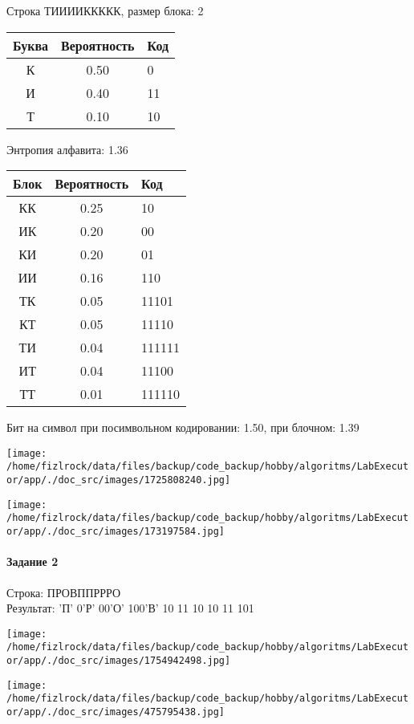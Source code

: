 \documentclass[a4paper, 12pt]{article}
\begin{document}
Строка ТИИИИККККК, размер блока: 2
\begin{center}
 \begin{tabular}{ |c|c|l| } 
  \hline
     Буква & Вероятность & Код\\ \hline
К & 0.50 & 0\\\hline
И & 0.40 & 11\\\hline
Т & 0.10 & 10
\\ \hline \end{tabular}
\end{center}
Энтропия алфавита: 1.36
\begin{center}
 \begin{tabular}{ |c|c|l| } 
  \hline
     Блок & Вероятность & Код\\ \hline
КК & 0.25 & 10\\\hline
ИК & 0.20 & 00\\\hline
КИ & 0.20 & 01\\\hline
ИИ & 0.16 & 110\\\hline
ТК & 0.05 & 11101\\\hline
КТ & 0.05 & 11110\\\hline
ТИ & 0.04 & 111111\\\hline
ИТ & 0.04 & 11100\\\hline
ТТ & 0.01 & 111110
\\ \hline \end{tabular}
\end{center}
Бит на символ при посимвольном кодировании: 1.50, при блочном: 1.39

\texttt{[image: /home/fizlrock/data/files/backup/code\_backup/hobby/algoritms/LabExecutor/app/./doc\_src/images/1725808240.jpg]}

\texttt{[image: /home/fizlrock/data/files/backup/code\_backup/hobby/algoritms/LabExecutor/app/./doc\_src/images/173197584.jpg]}
\pagebreak
\paragraph{Задание 2}

Строка: 
ПРОВППРРРО\\
Результат: 'П' 0'Р' 00'О' 100'В' 10 11 10 10 11 101

\texttt{[image: /home/fizlrock/data/files/backup/code\_backup/hobby/algoritms/LabExecutor/app/./doc\_src/images/1754942498.jpg]}

\texttt{[image: /home/fizlrock/data/files/backup/code\_backup/hobby/algoritms/LabExecutor/app/./doc\_src/images/475795438.jpg]}
\end{document}
